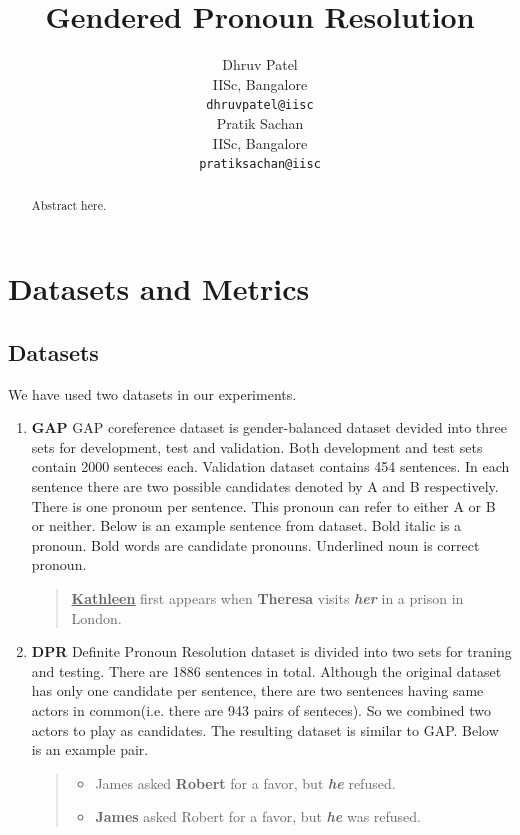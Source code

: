 \documentclass[11pt,a4paper]{article}
\title{Gendered Pronoun Resolution}
\author{Dhruv Patel \\
  IISc, Bangalore \\
  \texttt{dhruvpatel@iisc} \\\And
  Pratik Sachan \\
  IISc, Bangalore \\
  \texttt{pratiksachan@iisc} \\}
\date{}
\begin{document}
\maketitle
\begin{abstract}
  Abstract here.
\end{abstract}

\section{Datasets and Metrics}

\subsection{Datasets}

We have used two datasets in our experiments.
\begin{enumerate}
\item \textbf{GAP} GAP coreference dataset\cite{webster2018gap} is gender-balanced dataset devided into three sets for development, test and validation. Both development and test sets contain 2000 senteces each. Validation dataset contains 454 sentences. In each sentence there are two possible candidates denoted by A and B respectively. There is one pronoun per sentence. This pronoun can refer to either A or B or neither. Below is an example sentence from dataset. Bold italic is a pronoun. Bold words are candidate pronouns. Underlined noun is correct pronoun.
  \begin{quote}
    \textbf{\underline{Kathleen}} first appears when \textbf{Theresa} visits \textbf{\textit{her}} in a prison in London.
  \end{quote}

\item \textbf{DPR} Definite Pronoun Resolution \cite{rahman2012resolving} dataset is divided into two sets for traning and testing. There are 1886 sentences in total. Although the original dataset has only one candidate per sentence, there are two sentences having same actors in common(i.e. there are 943 pairs of senteces). So we combined two actors to play as candidates. The resulting dataset is similar to GAP. Below is an example pair.
  \begin{quote}
    \begin{itemize}
    \item James asked \textbf{Robert} for a favor, but \textit{\textbf{he}} refused.
    \item \textbf{James} asked Robert for a favor, but \textit{\textbf{he}} was refused.
    \end{itemize}
  \end{quote}
\end{enumerate}
\end{document}
